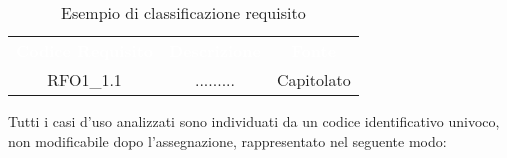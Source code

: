 \begin{table}[h]
	\centering
	\caption{Esempio di classificazione requisito} 
	
\renewcommand{\arraystretch}{1.5}
\begin{tabular}{|c c c|} 
	
	\rowcolor{darkblue}
	\textcolor{white}{\textbf{Codice Requisito}}&
	\textcolor{white}{\textbf{Descrizione}}&
	\textcolor{white}{\textbf{Fonte}}\\	

	RFO1\_1.1 & ......... & Capitolato\\

\end{tabular}
\end{table}

Tutti i casi d'uso analizzati sono individuati da un codice identificativo univoco, non modificabile dopo l'assegnazione, rappresentato nel seguente modo:

